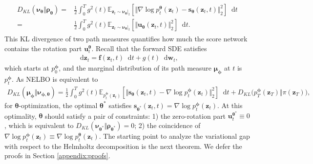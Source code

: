 \documentclass{article}
\theoremstyle{definition}
\theoremstyle{remark}
\newcommand*\diff{\mathop{}\!\mathrm{d}}
\begin{document}
	\begin{align}
	\begin{split}\label{eq:u_t}
	D_{KL}(\bm{\nu}_{\bm{\theta}}\Vert\bm{\rho}_{\bm{\theta}})=&\frac{1}{2}\int_{0}^{T}g^{2}(t)\mathbb{E}_{\mathbf{z}_{t}\sim\bm{\nu}_{\bm{\theta}}\vert_{t}}\left[\Vert \nabla\log{p_{t}^{\bm{\theta}}(\mathbf{z}_{t})}-\mathbf{s}_{\bm{\theta}}(\mathbf{z}_{t},t) \Vert_{2}^{2}\right]\diff t\\
	=&\frac{1}{2}\int_{0}^{T}g^{2}(t)\mathbb{E}_{\mathbf{z}_{t}\sim\bm{\nu}_{\bm{\theta}}\vert_{t}}\left[\Vert \mathbf{u}_{\bm{\theta}}(\mathbf{z}_{t},t) \Vert_{2}^{2}\right]\diff t.
	\end{split}
	\end{align}
	This KL divergence of two path measures quantifies how much the score network contains the rotation part $\mathbf{u}_{t}^{\bm{\theta}}$. Recall that the forward SDE satisfies
	\begin{align*}
	\diff\mathbf{z}_{t}=\mathbf{f}(\mathbf{z}_{t},t)\diff t+g(t)\diff\mathbf{w}_{t},
	\end{align*}
	which starts at $p_{0}^{\bm{\phi}}$, and the marginal distribution of its path measure $\bm{\mu}_{\bm{\phi}}$ at $t$ is $p_{t}^{\bm{\phi}}$. As NELBO is equivalent to
	\begin{align}\label{eq:nelbo_score}
	D_{KL}(\bm{\mu}_{\bm{\phi}}\Vert\bm{\nu}_{\bm{\phi},\bm{\theta}})=\frac{1}{2}\int_{0}^{T}g^{2}(t)\mathbb{E}_{p_{t}^{\bm{\phi}}(\mathbf{z}_{t})}\left[\Vert\mathbf{s}_{\bm{\theta}}(\mathbf{z}_{t},t)-\nabla\log{p_{t}^{\bm{\phi}}(\mathbf{z}_{t})}\Vert_{2}^{2}\right]\diff t+D_{KL}\big(p_{T}^{\bm{\phi}}(\mathbf{z}_{T})\Vert\pi(\mathbf{z}_{T})\big),
	\end{align}
	for $\bm{\theta}$-optimization, the optimal $\bm{\theta}^{*}$ satisfies $\mathbf{s}_{\bm{\theta}^{*}}(\mathbf{z}_{t},t)=\nabla\log{p_{t}^{\bm{\phi}}(\mathbf{z}_{t})}$. At this optimality, $\bm{\theta}$ should satisfy a pair of constraints: 1) the zero-rotation part $\mathbf{u}_{t}^{\bm{\theta}^{*}}\equiv 0$, which is equivalent to $D_{KL}(\bm{\nu}_{\bm{\theta}^{*}}\Vert\bm{\rho}_{\bm{\theta}^{*}})=0$; 2) the coincidence of $\nabla\log{p_{t}^{\bm{\phi}}(\mathbf{z}_{t})}\equiv \nabla\log{p_{t}^{\bm{\theta}}(\mathbf{z}_{t})}$. The starting point to analyze the variational gap with respect to the Helmholtz decomposition is the next theorem. We defer the proofs in Section \ref{appendix:proofs}. 
	
\end{document}
